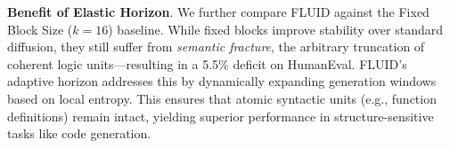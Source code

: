 \documentclass[11pt]{article}
\newcommand{\xmark}{\ding{55}}%
\begin{document}
\textbf{Benefit of Elastic Horizon}. We further compare FLUID against the Fixed Block Size ($k=16$) baseline. While fixed blocks improve stability over standard diffusion, they still suffer from \textit{semantic fracture}, the arbitrary truncation of coherent logic units—resulting in a 5.5\% deficit on HumanEval. FLUID's adaptive horizon addresses this by dynamically expanding generation windows based on local entropy. This ensures that atomic syntactic units (e.g., function definitions) remain intact, yielding superior performance in structure-sensitive tasks like code generation.


\end{document}
